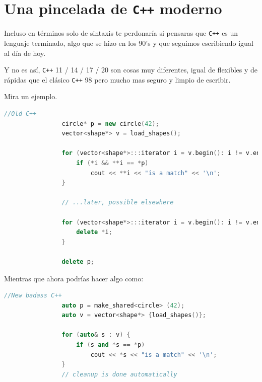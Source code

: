 \documentclass[12pt, fleqn]{report}                             %
\theoremstyle{break}                                            %
\newcommand{\textCode}[1]  { \texttt{#1} }                      %
\newcommand{\Cpp}{\ignorespaces\textCode{C++}}                  %
\begin{document}
        \clearpage
        \section{ Una pincelada de \Cpp moderno}

            Incluso en términos solo de sintaxis te perdonaría si pensaras que \Cpp es un
            lenguaje terminado, algo que se hizo en los 90's y que seguimos escribiendo
            igual al día de hoy.

            Y no es así, \Cpp 11 / 14 / 17 / 20 son cosas muy diferentes, igual de flexibles
            y de rápidas que el clásico \Cpp 98 pero mucho mas seguro y limpio de escribir.

            Mira un ejemplo.

            \begin{lstlisting}[language=C++, gobble=16]
                //Old C++
                circle* p = new circle(42);
                vector<shape*> v = load_shapes();

                for (vector<shape*>:::iterator i = v.begin(): i != v.end(); ++i) {
                    if (*i && **i == *p)
                        cout << **i << "is a match" << '\n';
                }

                // ...later, possible elsewhere

                for (vector<shape*>:::iterator i = v.begin(): i != v.end(); ++i) {
                    delete *i;
                }

                delete p;
            \end{lstlisting}

            Mientras que ahora podrías hacer algo como:
            \begin{lstlisting}[language=C++, gobble=16]
                //New badass C++
                auto p = make_shared<circle> (42);
                auto v = vector<shape*> {load_shapes()};

                for (auto& s : v) {
                    if (s and *s == *p)
                        cout << *s << "is a match" << '\n';
                }
                // cleanup is done automatically
            \end{lstlisting}

            \clearpage
\end{document}
